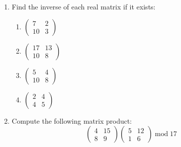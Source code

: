 \documentclass{book}
\theoremstyle{plain}
\theoremstyle{definition}
\newif\ifprintsolutions
\newcommand{\solution}[1]{\ifprintsolutions \begin{sloppypar}{\it #1}\end{sloppypar} \fi} %
\renewcommand{\mod}{\operatorname{mod}}
\renewcommand{\mod}{\operatorname{mod}}
\begin{document}
\begin{enumerate}
\begin{enumerate}
\end{enumerate}
\item Find the inverse of each real matrix if it exists:
\begin{enumerate}
\item $\begin{pmatrix} 7 & 2 \\ 10 & 3 \end{pmatrix}$ \solution{The inverse is $\begin{pmatrix} 3 & -2 \\ -10 & 7 \end{pmatrix}$.}
\item $\begin{pmatrix} 17 & 13 \\ 10 & 8 \end{pmatrix}$ \solution{The inverse is $\begin{pmatrix} \frac{4}{3} & \frac{-13}{6} \\ \frac{-5}{3} & \frac{17}{6} \end{pmatrix}$.}
\item $\begin{pmatrix} 5 & 4 \\ 10 & 8 \end{pmatrix}$ \solution{Not invertible}
\item $\begin{pmatrix} 2 & 4 \\ 4 & 5 \end{pmatrix}$ \solution{The inverse is $\begin{pmatrix} \frac{-5}{6} & \frac{2}{3} \\ \frac{2}{3} & \frac{-1}{3} \end{pmatrix}$.}
\end{enumerate}
\item Compute the following matrix product: $$\begin{pmatrix} 4 & 15 \\ 8 & 9 \end{pmatrix} \begin{pmatrix} 5 & 12 \\ 1 & 6 \end{pmatrix} \mod 17$$ \solution{The product is $\begin{pmatrix} 35 & 138 \\ 49 & 150 \end{pmatrix} \mod 17 \equiv \begin{pmatrix} 1 & 2 \\ 15 & 14 \end{pmatrix} \mod 17$.}

\end{enumerate}
\end{document}

